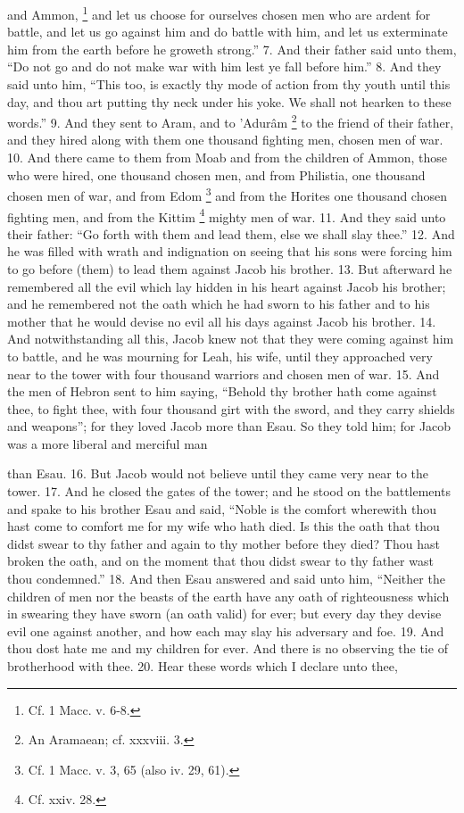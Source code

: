 and Ammon, \footnote{Cf. 1 Macc. v. 6-8.} and let us choose for ourselves chosen men who are ardent for battle, and let us go against him and do battle with him, and let us exterminate him from the earth before he groweth strong.'' 7. And their father said unto them, ``Do not go and do not make war with him lest ye fall before him.'' 8. And they said unto him, ``This too, is exactly thy mode of action from thy youth until this day, and thou art putting thy neck under his yoke. We shall not hearken to these words.'' 9. And they sent to Aram, and to ’Adurâm \footnote{An Aramaean; cf. xxxviii. 3.} to the friend of their father, and they hired along with them one thousand fighting men, chosen men of war. 10. And there came to them from Moab and from the children of Ammon, those who were hired, one thousand chosen men, and from Philistia, one thousand chosen men of war, and from Edom \footnote{Cf. 1 Macc. v. 3, 65 (also iv. 29, 61).} and from the Horites one thousand chosen fighting men, and from the Kittim \footnote{Cf. xxiv. 28.} mighty men of war. 11. And they said unto their father: ``Go forth with them and lead them, else we shall slay thee.'' 12. And he was filled with wrath and indignation on seeing that his sons were forcing him to go before (them) to lead them against Jacob his brother. 13. But afterward he remembered all the evil which lay hidden in his heart against Jacob his brother; and he remembered not the oath which he had sworn to his father and to his mother that he would devise no evil all his days against Jacob his brother. 14. And notwithstanding all this, Jacob knew not that they were coming against him to battle, and he was mourning for Leah, his wife, until they approached very near to the tower with four thousand warriors and chosen men of war. 15. And the men of Hebron sent to him saying, ``Behold thy brother hath come against thee, to fight thee, with four thousand girt with the sword, and they carry shields and weapons''; for they loved Jacob more than Esau. So they told him; for Jacob was a more liberal and merciful man

than Esau. 16. But Jacob would not believe until they came very near to the tower. 17. And he closed the gates of the tower; and he stood on the battlements and spake to his brother Esau and said, ``Noble is the comfort wherewith thou hast come to comfort me for my wife who hath died. Is this the oath that thou didst swear to thy father and again to thy mother before they died? Thou hast broken the oath, and on the moment that thou didst swear to thy father wast thou condemned.'' 18. And then Esau answered and said unto him, ``Neither the children of men nor the beasts of the earth have any oath of righteousness which in swearing they have sworn (an oath valid) for ever; but every day they devise evil one against another, and how each may slay his adversary and foe. 19. And thou dost hate me and my children for ever. And there is no observing the tie of brotherhood with thee. 20. Hear these words which I declare unto thee,

